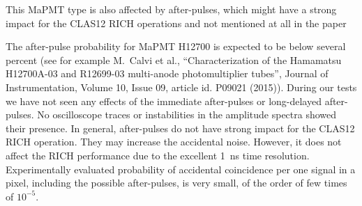 \documentclass[11pt]{report}
\begin{document}
\begin{tcolorbox}[enlarge top by=2em,colbacktitle=black!60!white,colframe=black!80!white,left=0pt,right=0pt,top=0pt,bottom=0pt,boxrule=0.3pt,title=\bfseries2.04]
This MaPMT type is also affected by after-pulses, which might have a strong impact for the CLAS12 RICH operations and not mentioned at all in the paper
\end{tcolorbox}


The after-pulse probability for MaPMT H12700 is expected to be below several percent (see for example M.~Calvi et al.,   ``Characterization of the Hamamatsu H12700A-03 and R12699-03 multi-anode photomultiplier tubes'', Journal of Instrumentation, Volume 10, Issue 09, article id. P09021 (2015)). 
During our tests we have not seen any effects of the immediate after-pulses or long-delayed after-pulses. 
No oscilloscope traces or  instabilities in the amplitude spectra showed their presence.
In general, after-pulses do not have strong impact for the CLAS12 RICH operation. They may increase the accidental noise. However, it does not affect the RICH performance due to the excellent 1~ns time resolution. Experimentally evaluated probability of accidental coincidence per one signal in a pixel, including the possible after-pulses, is very small, of the order of few times of $10^{-5}$.



\end{document}
